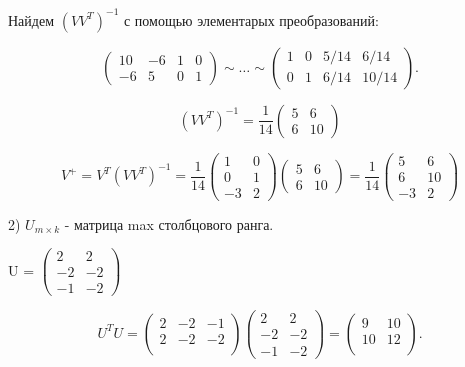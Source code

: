 \begin{example}
    Найдем $(VV^T)^{-1}$ с помощью элементарых преобразований:

    \begin{equation*}
        \left(\begin{array}{cc|cc}
            10 & -6 & 1 & 0 \\
            -6 & 5 & 0 & 1
        \end{array}\right)
        \sim \ldots \sim
        \left(\begin{array}{cc|cc}
            1 & 0 & 5/14 & 6/14 \\
            0 & 1 & 6/14 & 10/14
        \end{array}\right)
    .\end{equation*}

    $$(VV^T)^{-1} = \frac{1}{14}\left(\begin{array}{cc}
        5 & 6 \\
        6 & 10
    \end{array}\right)$$

    $$V^+ = V^T(VV^T)^{-1} = \frac{1}{14}\left(\begin{array}{cc}
        1 & 0 \\
        0 & 1 \\
        -3 & 2
    \end{array}\right)
    \left(\begin{array}{cc}
        5 & 6 \\
        6 & 10
    \end{array}\right) = \frac{1}{14}\left(\begin{array}{cc}
        5 & 6 \\
        6 & 10 \\
        -3 & 2
    \end{array}\right)$$

    2) $U_{m \times k}$ - матрица max столбцового ранга.

    U = $\left(\begin{array}{cc}
        2 & 2 \\
        -2 & -2 \\
        -1 & -2
    \end{array}\right)$

    \begin{equation*}
        U^TU = \left(\begin{array}{ccc}
            2 & -2 & -1 \\
            2 & -2 & -2 \\
        \end{array}\right)
        \left(\begin{array}{cc}
            2 & 2 \\
            -2 & -2 \\
            -1 & -2
        \end{array}\right)
        =
        \left(\begin{array}{cc}
            9 & 10 \\
            10 & 12 \\
        \end{array}\right)
    .\end{equation*}


\end{example}
